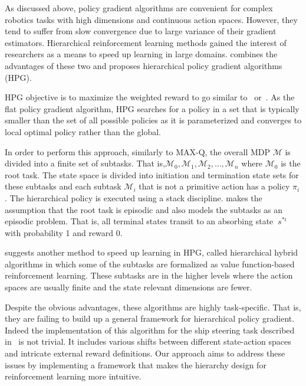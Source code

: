 As discussed above, policy gradient algorithms are convenient for complex robotics tasks with high dimensions and continuous action spaces. However, they tend to suffer from slow convergence due to large variance of their gradient estimators. Hierarchical reinforcement learning methods gained the interest of researchers as a means to speed up learning in large domains. \cite{GhavamzadehHierarchicalPG} combines the advantages of these two and proposes hierarchical policy gradient algorithms (HPG). 

HPG objective is to maximize the weighted reward to go similar to~\cite{Marbach1998SimulationB} or~\cite{Bartlett2001InfiniteHorizonPE}. As the flat policy gradient algorithm, HPG searches for a policy in a set that is typically smaller than the set of all possible policies as it is parameterized and converges to local optimal policy rather than the global.  

In order to perform this approach, similarly to MAX-Q, the overall MDP $\mathcal{M}$ is divided into a finite set of subtasks. That is,${\mathcal{M}_0, \mathcal{M}_1, \mathcal{M}_2,\dotsc,\mathcal{M}_n}$ where $\mathcal{M}_0$ is the root task. The state space is divided into initiation and termination state sets for these subtasks and each subtask $\mathcal{M}_i$ that is not a primitive action has a policy $\pi_i$. The hierarchical policy is executed using a stack discipline. \cite{GhavamzadehHierarchicalPG} makes the assumption that the root task is episodic and also models the subtasks as an episodic problem. That is, all terminal states transit to an absorbing state $\ s^{*i}$ with probability 1 and reward 0.

\cite{GhavamzadehHierarchicalPG} suggests another method to speed up learning in HPG, called hierarchical hybrid algorithms in which some of the subtasks are formalized as value function-based reinforcement learning. These subtasks are in the higher levels where the action spaces are usually finite and the state relevant dimensions are fewer.  

Despite the obvious advantages, these algorithms are highly task-specific. That is, they are failing to build up a general framework for hierarchical policy gradient. Indeed the implementation of this algorithm for the ship steering task described in~\cite{GhavamzadehHierarchicalPG} is not trivial. It includes various shifts between different state-action spaces and intricate external reward definitions. Our approach aims to address these issues by implementing a framework that makes the hierarchy design for reinforcement learning more intuitive. 

